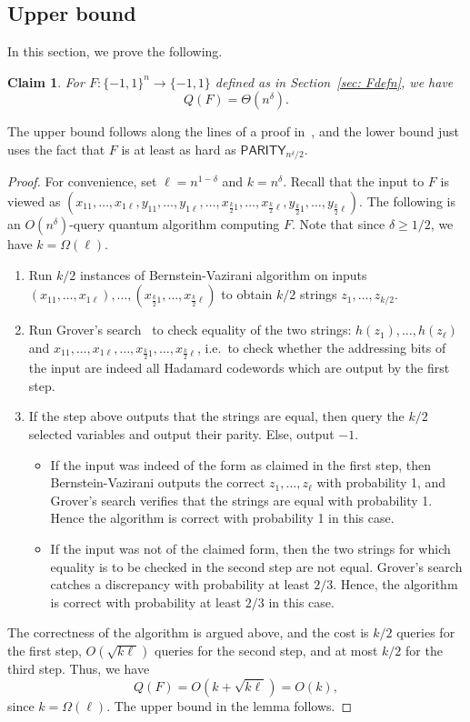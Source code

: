 \documentclass[10pt,a4paper]{article}
\newtheorem{claim}[theorem]{Claim}
\theoremstyle{definition}
\newcommand{\bra}[1]{\{#1\}}
\newcommand{\pmone}{\bra{-1,1}}
\newcommand{\PARITY}{\mathsf{PARITY}}
\begin{document}
\subsection{Upper bound}\label{sec: upper}
In this section, we prove the following.
\begin{claim}\label{claim: ndelta}
For $F: \pmone^{n} \to \pmone$ defined as in Section~\ref{sec: Fdefn}, we have
\[
Q(F) = \Theta(n^{\delta}).
\]
\end{claim}
The upper bound follows along the lines of a proof in~\cite{AdW14}, and the lower bound just uses the fact that $F$ is at least as hard as $\PARITY_{n^{\delta}/2}$.
\begin{proof}
For convenience, set $\ell = n^{1-\delta}$ and $k = n^{\delta}$.
Recall that the input to $F$ is viewed as $(x_{11},\ldots,x_{1\ell},y_{11},\ldots,y_{1\ell},\ldots,x_{\frac{k}{2}1},\ldots,x_{\frac{k}{2}\ell},y_{\frac{k}{2}1},\ldots,y_{\frac{k}{2}\ell})$. The following is an $O(n^\delta)$-query quantum algorithm computing $F$. Note that since $\delta \geq 1/2$, we have $k = \Omega(\ell)$.
\begin{enumerate}
    \item Run $k/2$ instances of Bernstein-Vazirani algorithm on inputs $(x_{11}, \dots, x_{1\ell}), \dots, (x_{\frac{k}{2}1}, \dots, x_{\frac{k}{2}\ell})$ to obtain $k/2$ strings $z_1, \dots, z_{k/2}$.
    \item Run Grover's search~\cite{Grover96, BHMT02} to check equality of the two strings: $h(z_1), \dots, h(z_\ell)$ and  $x_{11}, \dots, x_{1\ell}, \dots, x_{\frac{k}{2}1}, \dots, x_{\frac{k}{2}\ell}$, i.e.~to check whether the addressing bits of the input are indeed all Hadamard codewords which are output by the first step.
    \item If the step above outputs that the strings are equal, then query the $k/2$ selected variables and output their parity.  Else, output $-1$.
    \begin{itemize}
        \item If the input was indeed of the form as claimed in the first step, then Bernstein-Vazirani outputs the correct $z_1, \dots, z_\ell$ with probability 1, and Grover's search verifies that the strings are equal with probability 1.  Hence the algorithm is correct with probability 1 in this case.
        \item If the input was not of the claimed form, then the two strings for which equality is to be checked in the second step are not equal.  Grover's search catches a discrepancy with probability at least $2/3$.  Hence, the algorithm is correct with probability at least $2/3$ in this case.
        \end{itemize}
\end{enumerate}
The correctness of the algorithm is argued above, and the cost is $k/2$ queries for the first step, $O(\sqrt{k\ell})$ queries for the second step, and at most $k/2$ for the third step.
Thus, we have
\[
Q(F) = O(k + \sqrt{k\ell}) = O(k),
\]
since $k = \Omega(\ell)$.  The upper bound in the lemma follows.


\end{proof}
\end{document}
